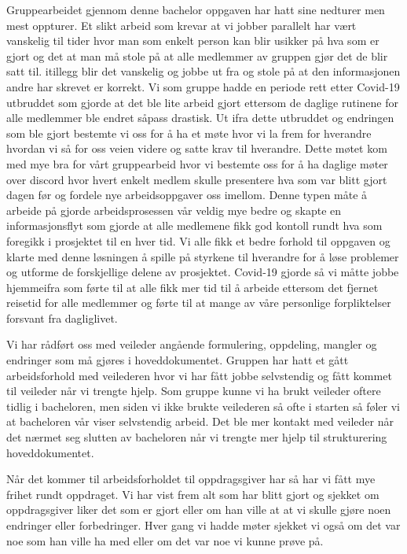 Gruppearbeidet gjennom denne bachelor oppgaven har hatt sine nedturer men mest oppturer. Et slikt arbeid som krevar at vi jobber parallelt har vært vanskelig til tider hvor man som enkelt person kan blir usikker på hva som er gjort og det at man må stole på at alle medlemmer av gruppen gjør det de blir satt til. itillegg blir det vanskelig og jobbe ut fra og stole på at den informasjonen andre har skrevet er korrekt. Vi som gruppe hadde en periode rett etter Covid-19 utbruddet som gjorde at det ble lite arbeid gjort ettersom de daglige rutinene for alle medlemmer ble endret såpass drastisk. Ut ifra dette utbruddet og endringen som ble gjort bestemte vi oss for å ha et møte hvor vi la frem for hverandre hvordan vi så for oss veien videre og satte krav til hverandre. Dette møtet kom med mye bra for vårt gruppearbeid hvor vi bestemte oss for å ha daglige møter over discord hvor hvert enkelt medlem skulle presentere hva som var blitt gjort dagen før og fordele nye arbeidsoppgaver oss imellom. Denne typen måte å arbeide på gjorde arbeidsprosessen vår veldig mye bedre og skapte en informasjonsflyt som gjorde at alle medlemene fikk god kontoll rundt hva som foregikk i prosjektet til en hver tid. Vi alle fikk et bedre forhold til oppgaven og klarte med denne løsningen å spille på styrkene til hverandre for å løse problemer og utforme de forskjellige delene av prosjektet. Covid-19 
gjorde så vi måtte jobbe hjemmeifra som førte til at alle fikk mer tid til å arbeide ettersom det fjernet reisetid for alle medlemmer og førte til at mange av våre personlige forpliktelser forsvant fra dagliglivet.

Vi har rådført oss med veileder angående formulering, oppdeling, mangler og endringer som må gjøres i hoveddokumentet. Gruppen har hatt et gått arbeidsforhold med veilederen hvor vi har fått jobbe selvstendig og fått kommet til veileder når vi trengte hjelp. Som gruppe kunne vi ha brukt veileder oftere tidlig i bacheloren, men siden vi ikke brukte veilederen så ofte i starten så føler vi at bacheloren vår viser selvstendig arbeid. Det ble mer kontakt med veileder når det nærmet seg slutten av bacheloren når vi trengte mer hjelp til strukturering hoveddokumentet. 

Når det kommer til arbeidsforholdet til oppdragsgiver har så har vi fått mye frihet rundt oppdraget. Vi har vist frem alt som har blitt gjort og sjekket om oppdragsgiver liker det som er gjort eller om han ville at at vi skulle gjøre noen endringer eller forbedringer. Hver gang vi hadde møter sjekket vi også om det var noe som han ville ha med eller om det var noe vi kunne prøve på. 

